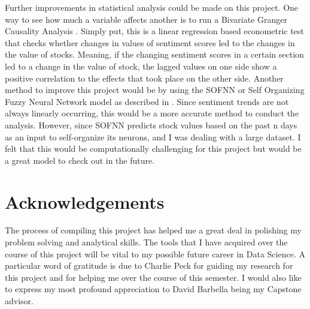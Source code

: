 \documentclass{acm_proc_article-sp}
\begin{document}
Further improvements in statistical analysis could be made on this project. One way to see how much a variable affects another is to run a Bivariate Granger Causality Analysis \cite{bollen_twitter_2011}. Simply put, this is a linear regression based econometric test that checks whether changes in values of sentiment scores led to the changes in the value of stocks. Meaning, if the changing sentiment scores in a certain section led to a change in the value of stock, the lagged values on one side show a positive correlation to the effects that took place on the other side. Another method to improve this project would be by using the SOFNN or Self Organizing Fuzzy Neural Network model as described in \cite{bollen_twitter_2011}. Since sentiment trends are not always linearly occurring, this would be a more accurate method to conduct the analysis. However, since SOFNN predicts stock values based on the past n days as an input to self-organize its neurons, and I was dealing with a large dataset. I felt that this would be computationally challenging for this project but would be a great model to check out in the future.

\section{Acknowledgements}
The process of compiling this project has helped me a great deal in polishing my problem solving and analytical skills. The tools that I have acquired over the course of this project will be vital to my possible future career in Data Science. A particular word of gratitude is due to Charlie Peck for guiding my research for this project and for helping me over the course of this semester. 
I would also like to express my most profound appreciation to David Barbella being my Capstone advisor. 






\end{document}
